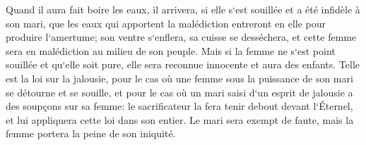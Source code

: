 \verse Quand il aura fait boire les eaux, il arrivera, si elle s`est souillée et a été infidèle à son mari, que les eaux qui apportent la malédiction entreront en elle pour produire l`amertume; son ventre s`enflera, sa cuisse se desséchera, et cette femme sera en malédiction au milieu de son peuple. 
\verse Mais si la femme ne s`est point souillée et qu`elle soit pure, elle sera reconnue innocente et aura des enfants. 
\verse Telle est la loi sur la jalousie, pour le cas où une femme sous la puissance de son mari se détourne et se souille, 
\verse et pour le cas où un mari saisi d`un esprit de jalousie a des soupçons sur sa femme: le sacrificateur la fera tenir debout devant l`Éternel, et lui appliquera cette loi dans son entier. 
\verse Le mari sera exempt de faute, mais la femme portera la peine de son iniquité. 

